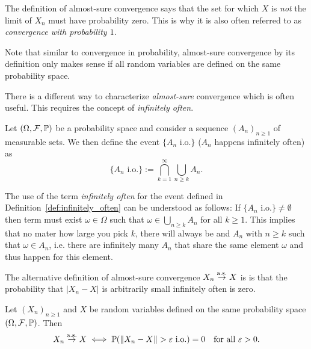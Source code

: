 The definition of almost-sure convergence says that the set for which $X$ is \emph{not} the limit of $X_n$ must have probability zero. This is why it is also often referred to as \emph{convergence with probability $1$}.

Note that similar to convergence in probability, almost-sure convergence by its definition only makes sense if all random variables are defined on the same probability space. 

There is a different way to characterize \emph{almost-sure} convergence which is often useful. This requires the concept of \emph{infinitely often}.

\begin{definition}\label{def:infinitely_often}
Let $(\Omega, \mathcal F, \mathbb P)$ be a probability space and consider a sequence $(A_n)_{n \ge 1}$ of measurable sets. We then define the event $\{A_n \text{ i.o.}\}$ ($A_n$ happens infinitely often) as
\[
	\{A_n \text{ i.o.}\} := \bigcap_{k = 1}^\infty \bigcup_{n \ge k} A_n.
\]
\end{definition}

The use of the term \emph{infinitely often} for the event defined in Definition~\ref{def:infinitely_often} can be understood as follows: If $\{A_n \text{ i.o.}\} \ne \emptyset$ then term must exist $\omega \in \Omega$ such that $\omega \in \bigcup_{n \ge k} A_n$ for all $k \ge 1$. This implies that no mater how large you pick $k$, there will always be and $A_n$ with $n \ge k$ such that $\omega \in A_n$, i.e. there are infinitely many $A_n$ that share the same element $\omega$ and thus happen for this element.

The alternative definition of almost-sure convergence $X_n \stackrel{\mathrm{a.s.}}{\rightarrow} X$ is is that the probability that $|X_n - X|$ is arbitrarily small infinitely often is zero.

\begin{lemma}\label{lem:almost_sure_alternative}
Let $(X_n)_{n \ge 1}$ and $X$ be random variables defined on the same probability space $(\Omega, \mathcal F, \mathbb P)$. Then
\[
	X_n \stackrel{\mathrm{a.s.}}{\rightarrow} X \iff \mathbb P(\|X_n - X\| > \varepsilon \text{ i.o.}) = 0 \quad \text{for all } \varepsilon > 0.
\]
\end{lemma}

